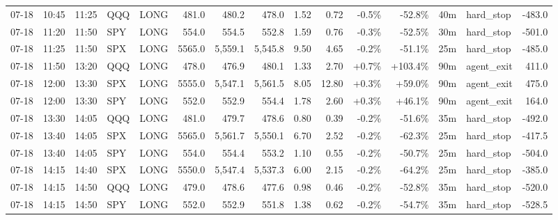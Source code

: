 \documentclass[11pt,a4paper,twoside]{article}
\begin{document}
\begin{landscape}
\begin{center}
\begin{longtable}{>{\color{txtmain}}l l l l l r r r r r r r r >{\color{txtmain}}l r}
07-18 & 10:45 & 11:25 & QQQ & LONG & 481.0 & 480.2 & 478.0 & 1.52 & 0.72 & \textcolor{lossred}{-0.5\%} & \textcolor{lossred}{-52.8\%} & 40m & hard\_stop & \textcolor{lossred}{-483.0} \\
07-18 & 11:20 & 11:50 & SPY & LONG & 554.0 & 554.5 & 552.8 & 1.59 & 0.76 & \textcolor{lossred}{-0.3\%} & \textcolor{lossred}{-52.5\%} & 30m & hard\_stop & \textcolor{lossred}{-501.0} \\
07-18 & 11:25 & 11:50 & SPX & LONG & 5565.0 & 5,559.1 & 5,545.8 & 9.50 & 4.65 & \textcolor{lossred}{-0.2\%} & \textcolor{lossred}{-51.1\%} & 25m & hard\_stop & \textcolor{lossred}{-485.0} \\
07-18 & 11:50 & 13:20 & QQQ & LONG & 478.0 & 476.9 & 480.1 & 1.33 & 2.70 & \textcolor{wingreen}{+0.7\%} & \textcolor{wingreen}{+103.4\%} & 90m & agent\_exit & \textcolor{wingreen}{411.0} \\
07-18 & 12:00 & 13:30 & SPX & LONG & 5555.0 & 5,547.1 & 5,561.5 & 8.05 & 12.80 & \textcolor{wingreen}{+0.3\%} & \textcolor{wingreen}{+59.0\%} & 90m & agent\_exit & \textcolor{wingreen}{475.0} \\
07-18 & 12:00 & 13:30 & SPY & LONG & 552.0 & 552.9 & 554.4 & 1.78 & 2.60 & \textcolor{wingreen}{+0.3\%} & \textcolor{wingreen}{+46.1\%} & 90m & agent\_exit & \textcolor{wingreen}{164.0} \\
07-18 & 13:30 & 14:05 & QQQ & LONG & 481.0 & 479.7 & 478.6 & 0.80 & 0.39 & \textcolor{lossred}{-0.2\%} & \textcolor{lossred}{-51.6\%} & 35m & hard\_stop & \textcolor{lossred}{-492.0} \\
07-18 & 13:40 & 14:05 & SPX & LONG & 5565.0 & 5,561.7 & 5,550.1 & 6.70 & 2.52 & \textcolor{lossred}{-0.2\%} & \textcolor{lossred}{-62.3\%} & 25m & hard\_stop & \textcolor{lossred}{-417.5} \\
07-18 & 13:40 & 14:05 & SPY & LONG & 554.0 & 554.4 & 553.2 & 1.10 & 0.55 & \textcolor{lossred}{-0.2\%} & \textcolor{lossred}{-50.7\%} & 25m & hard\_stop & \textcolor{lossred}{-504.0} \\
07-18 & 14:15 & 14:40 & SPX & LONG & 5550.0 & 5,547.4 & 5,537.3 & 6.00 & 2.15 & \textcolor{lossred}{-0.2\%} & \textcolor{lossred}{-64.2\%} & 25m & hard\_stop & \textcolor{lossred}{-385.0} \\
07-18 & 14:15 & 14:50 & QQQ & LONG & 479.0 & 478.6 & 477.6 & 0.98 & 0.46 & \textcolor{lossred}{-0.2\%} & \textcolor{lossred}{-52.8\%} & 35m & hard\_stop & \textcolor{lossred}{-520.0} \\
07-18 & 14:15 & 14:50 & SPY & LONG & 552.0 & 552.9 & 551.8 & 1.38 & 0.62 & \textcolor{lossred}{-0.2\%} & \textcolor{lossred}{-54.7\%} & 35m & hard\_stop & \textcolor{lossred}{-528.5} \\

\end{longtable}
\end{center}
\end{landscape}
\end{document}
